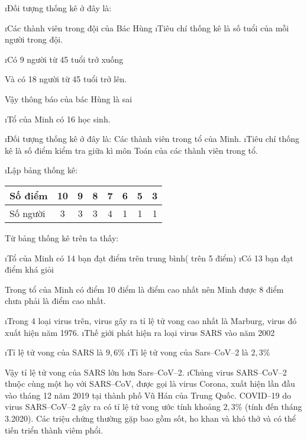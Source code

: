 \begin{Answer}{1}
		\begin{enumerate}[a),leftmargin=*]
			\i Đối tượng thống kê ở đây là:
			\begin{enumerate}[+,leftmargin=*]
				\i Các thành viên trong đội của Bác Hùng
				\i Tiêu chí thống kê là số tuổi của mỗi người trong đội.
			\end{enumerate}
			\i Có 9 người từ  45 tuổi trở xuống
			
			Và có 18 người từ 45 tuổi trở lên.
			
			Vậy thông báo của bác Hùng là sai
		\end{enumerate}
	
\end{Answer}
\begin{Answer}{2}
		\begin{enumerate}[a),leftmargin=*]
			\i Tổ của Minh có 16  học sinh.
			\begin{enumerate}[--,leftmargin=*]
				\i Đối tượng thống kê ở đây là: Các thành viên trong tổ của Minh.
				\i Tiêu chí thống kê là số điểm kiểm tra giữa kì môn Toán của các thành viên trong tổ.
			\end{enumerate}
			\i Lập bảng thống kê:
			\begin{center}
				\begin{tabular}{|l|c|c|c|c|c|c|c|}
					\hline
					Số điểm & 10 & 9&8&7&6&5&3\\
					\hline
					Số người& 3&3&3&4&1&1&1\\
					\hline
				\end{tabular}
			\end{center}	
			Từ bảng thống kê trên ta thấy:
			\begin{enumerate}[+,leftmargin=*]
				\i Tổ của Minh có 14  bạn đạt điểm trên trung bình( trên 5 điểm)
				\i Có 13 bạn đạt điểm khá giỏi
			\end{enumerate}
			Trong tổ của Minh có điểm 10 điểm là điểm cao nhất nên Minh được 8 điểm chưa phải là điểm cao nhất.
		\end{enumerate}
	
\end{Answer}
\begin{Answer}{3}
		\begin{enumerate}[a),leftmargin=*]
			\i Trong 4 loại virus trên, virus gây ra tỉ lệ tử vong cao nhất là Marburg, virus đó xuất hiện năm 1976.
			\i Thế giới phát hiện ra loại virus SARS vào năm 2002
			\begin{enumerate}[+,leftmargin=*]
				\i Tỉ lệ tử vong của SARS là  $9,6\%$
				\i Tỉ lệ tử vong của Sars--CoV--2 là $2,3 \%$
			\end{enumerate}
			Vậy tỉ lệ tử vong của SARS lớn hơn Sars--CoV--2.
			\i Chủng virus SARS--CoV--2 thuộc cùng một họ với SARS--CoV, được gọi là virus Corona, xuất hiện lần đầu vào tháng 12 năm 2019 tại thành phố Vũ Hán của Trung Quốc. COVID--19 do virus SARS--CoV--2 gây ra có tỉ lệ tử vong ước tính khoảng $2,3\%$ (tính đến tháng 3.2020). Các triệu chứng thường gặp bao gồm sốt, ho khan và khó thở và có thể tiến triển thành viêm phổi.
		\end{enumerate}
	
\end{Answer}
